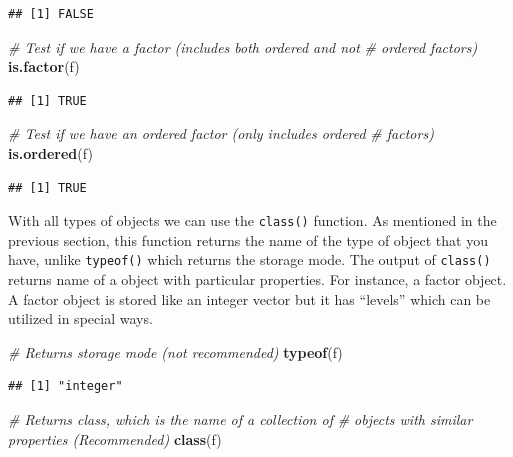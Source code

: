 \documentclass[
]{book}
\newenvironment{Shaded}{\begin{snugshade}}{\end{snugshade}}
\newcommand{\CommentTok}[1]{\textcolor[rgb]{0.56,0.35,0.01}{\textit{#1}}}
\newcommand{\KeywordTok}[1]{\textcolor[rgb]{0.13,0.29,0.53}{\textbf{#1}}}
\newcommand{\NormalTok}[1]{#1}
\begin{document}
\begin{verbatim}
## [1] FALSE
\end{verbatim}

\begin{Shaded}
\begin{Highlighting}[]
\CommentTok{# Test if we have a factor (includes both ordered and not}
\CommentTok{# ordered factors)}
\KeywordTok{is.factor}\NormalTok{(f)}
\end{Highlighting}
\end{Shaded}

\begin{verbatim}
## [1] TRUE
\end{verbatim}

\begin{Shaded}
\begin{Highlighting}[]
\CommentTok{# Test if we have an ordered factor (only includes ordered}
\CommentTok{# factors)}
\KeywordTok{is.ordered}\NormalTok{(f)}
\end{Highlighting}
\end{Shaded}

\begin{verbatim}
## [1] TRUE
\end{verbatim}

With all types of objects we can use the \texttt{class()} function. As mentioned in the previous section, this function returns the name of the type of object that you have, unlike \texttt{typeof()} which returns the storage mode. The output of \texttt{class()} returns name of a object with particular properties. For instance, a factor object. A factor object is stored like an integer vector but it has ``levels'' which can be utilized in special ways.

\begin{Shaded}
\begin{Highlighting}[]
\CommentTok{# Returns storage mode (not recommended)}
\KeywordTok{typeof}\NormalTok{(f)}
\end{Highlighting}
\end{Shaded}

\begin{verbatim}
## [1] "integer"
\end{verbatim}

\begin{Shaded}
\begin{Highlighting}[]
\CommentTok{# Returns class, which is the name of a collection of}
\CommentTok{# objects with similar properties (Recommended)}
\KeywordTok{class}\NormalTok{(f)}
\end{Highlighting}
\end{Shaded}
\end{document}
